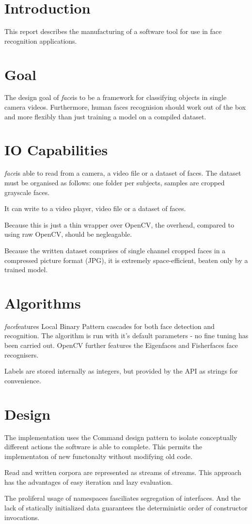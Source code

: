 \documentclass{article}
\title{}
\author{Miroslav Vitkov}
\date{\today}
\newcommand{\face}[0]{\textit{face}}
\begin{document}
\maketitle


\section{Introduction}
This report describes the manufacturing of a software tool for use in face recognition applications.


\section{Goal}
The design goal of \face is to be a framework for classifying objects in single camera videos.
Furthermore, human faces recognision should work out of the box and more flexibly than just training a model on a compiled dataset.


\section{IO Capabilities}
\face is able to read from a camera, a video file or a dataset of faces.
The dataset must be organised as follows: one folder per subjects, samples are cropped grayscale faces.
\par
It can write to a video player, video file or a dataset of faces.
\par
Because this is just a thin wrapper over OpenCV, the overhead, compared to using raw OpenCV, should be negleagable.
\par
Because the written dataset comprises of single channel cropped faces in a compressed picture format (JPG), it is extremely space-efficient, 
beaten only by a trained model.


\section{Algorithms}
\face features Local Binary Pattern cascades for both face detection and recognition.
The algorithm is run with it's default parameters - no fine tuning has been carried out.
OpenCV further features the Eigenfaces and Fisherfaces face recognisers.
\par
Labels are stored internally as integers, but provided by the API as strings for convenience.


\section{Design}
The implementation uses the Command design pattern to isolate conceptually different actions the software is able to complete.
This permits the implementaton of new functonalty without modifying old code.
\par
Read and written corpora are represented as streams of streams.
This approach has the advantages of easy iteration and lazy evaluation.
\par
The proliferal usage of namespaces fasciliates segregation of interfaces.
And the lack of statically initialized data guarantees the deterministic order of constructor invocations.
\end{document}
